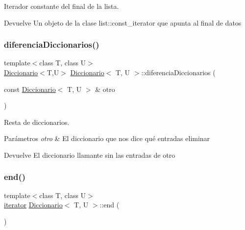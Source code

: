 Iterador constante del final de la lista. 

\begin{DoxyReturn}{Devuelve}
Un objeto de la clase list\+::const\+\_\+iterator que apunta al final de datos 
\end{DoxyReturn}
\mbox{\label{classDiccionario_aeb9185c8e3f815b19c4f6b1811587787}} 
\subsubsection{\texorpdfstring{diferencia\+Diccionarios()}{diferenciaDiccionarios()}}
{\footnotesize\ttfamily template$<$class T, class U$>$ \\
\hyperlink{classDiccionario}{Diccionario}$<$T,U$>$ \hyperlink{classDiccionario}{Diccionario}$<$ T, U $>$\+::diferencia\+Diccionarios (\begin{DoxyParamCaption}\item[{const \hyperlink{classDiccionario}{Diccionario}$<$ T, U $>$ \&}]{otro }\end{DoxyParamCaption})}



Resta de diccionarios. 


\begin{DoxyParams}{Parámetros}
{\em otro} & El diccionario que nos dice qué entradas eliminar \\
\hline
\end{DoxyParams}
\begin{DoxyReturn}{Devuelve}
El diccionario llamante sin las entradas de otro 
\end{DoxyReturn}
\mbox{\label{classDiccionario_adb5cdbfce59b4005bd07473273df3a8e}} 
\subsubsection{\texorpdfstring{end()}{end()}}
{\footnotesize\ttfamily template$<$class T, class U$>$ \\
\hyperlink{classDiccionario_1_1iterator}{iterator} \hyperlink{classDiccionario}{Diccionario}$<$ T, U $>$\+::end (\begin{DoxyParamCaption}{ }\end{DoxyParamCaption})}




